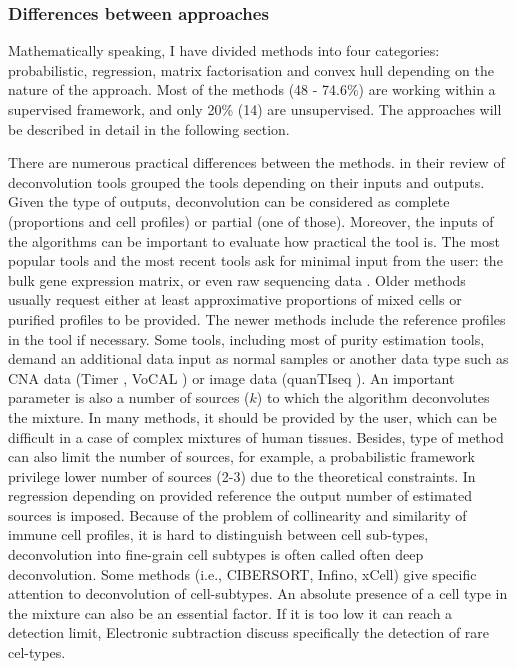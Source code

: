 \documentclass[12pt,]{book}
\theoremstyle{definition}
\theoremstyle{definition}
\theoremstyle{definition}
\theoremstyle{remark}
\begin{document}
\hypertarget{differences-between-approaches}{%
\subsubsection{Differences between
approaches}\label{differences-between-approaches}}

Mathematically speaking, I have divided methods into four categories:
probabilistic, regression, matrix factorisation and convex hull
depending on the nature of the approach. Most of the methods (48 -
74.6\%) are working within a supervised framework, and only 20\% (14)
are unsupervised. The approaches will be described in detail in the
following section.

There are numerous practical differences between the methods.
\citet{Shen-Orr2013} in their review of deconvolution tools grouped the
tools depending on their inputs and outputs. Given the type of outputs,
deconvolution can be considered as complete (proportions and cell
profiles) or partial (one of those). Moreover, the inputs of the
algorithms can be important to evaluate how practical the tool is. The
most popular tools and the most recent tools ask for minimal input from
the user: the bulk gene expression matrix, or even raw sequencing data
\citep{Finotello2017}. Older methods usually request either at least
approximative proportions of mixed cells or purified profiles to be
provided. The newer methods include the reference profiles in the tool
if necessary. Some tools, including most of purity estimation tools,
demand an additional data input as normal samples or another data type
such as CNA data (Timer \citep{Li2013}, VoCAL \citep{Steuerman2016}) or
image data (quanTIseq \citep{Finotello2017}). An important parameter is
also a number of sources (\(k\)) to which the algorithm deconvolutes the
mixture. In many methods, it should be provided by the user, which can
be difficult in a case of complex mixtures of human tissues. Besides,
type of method can also limit the number of sources, for example, a
probabilistic framework privilege lower number of sources (2-3) due to
the theoretical constraints. In regression depending on provided
reference the output number of estimated sources is imposed. Because of
the problem of collinearity and similarity of immune cell profiles, it
is hard to distinguish between cell sub-types, deconvolution into
fine-grain cell subtypes is often called often deep deconvolution. Some
methods (i.e., CIBERSORT, Infino, xCell) give specific attention to
deconvolution of cell-subtypes. An absolute presence of a cell type in
the mixture can also be an essential factor. If it is too low it can
reach a detection limit, Electronic subtraction \citep{Gosink2007}
discuss specifically the detection of rare cel-types.
\end{document}

